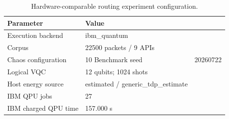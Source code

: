 \begin{table}[htbp]
\caption{Hardware-comparable routing experiment configuration.}
\label{tab:routing-experiment-configuration}
\centering
\begin{tabular}{ll}
\hline
Parameter & Value \\
\hline
Execution backend & ibm\_quantum \\
Corpus & 22500 packets / 9 APIs \\
Chaos configuration & 10%
Benchmark seed & 20260722 \\
Logical VQC & 12 qubits; 1024 shots \\
Host energy source & estimated / generic\_tdp\_estimate \\
IBM QPU jobs & 27 \\
IBM charged QPU time & 157.000 s \\
\hline
\end{tabular}
\end{table}

